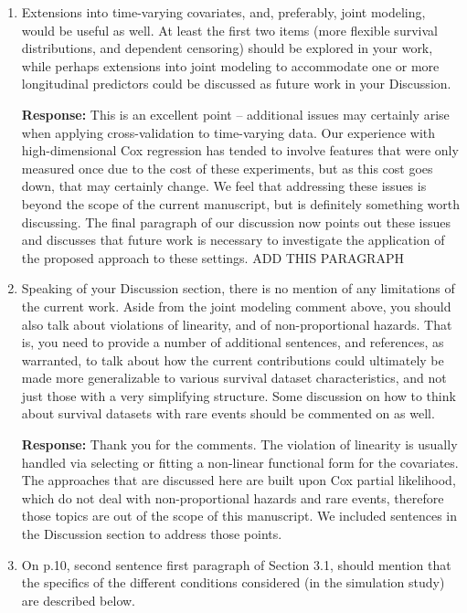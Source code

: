 \documentclass[12]{article}
\newcommand{\re}{\textbf{Response: }}
\newcommand\pb[1]{{\color{red}#1}}
\begin{document}
\begin{enumerate}[align = left]
\item Extensions into time-varying covariates, and, preferably, joint modeling, would be useful as well. At least the first two items (more flexible survival distributions, and dependent censoring) should be explored in your work, while perhaps extensions into joint modeling to accommodate one or more longitudinal predictors could be discussed as future work in your Discussion.
        
\re This is an excellent point -- additional issues may certainly arise when applying cross-validation to time-varying data. Our experience with high-dimensional Cox regression has tended to involve features that were only measured once due to the cost of these experiments, but as this cost goes down, that may certainly change. We feel that addressing these issues is beyond the scope of the current manuscript, but is definitely something worth discussing. The final paragraph of our discussion now points out these issues and discusses that future work is necessary to investigate the application of the proposed approach to these settings. \pb{ADD THIS PARAGRAPH}

\item \label{limitations} Speaking of your Discussion section, there is no mention of any limitations of the current work. Aside from the joint modeling comment above, you should also talk about violations of linearity, and of non-proportional hazards. That is, you need to provide a number of additional sentences, and references, as warranted, to talk about how the current contributions could ultimately be made more generalizable to various survival dataset characteristics, and not just those with a very simplifying structure. Some discussion on how to think about survival datasets with rare events should be commented on as well.

\re Thank you for the comments. The violation of linearity is usually handled via selecting or fitting a non-linear functional form for the covariates. The approaches that are discussed here are built upon Cox partial likelihood, which do not deal with non-proportional hazards and rare events, therefore those topics are out of the scope of this manuscript.  We included sentences in the Discussion section to address those points.

\item On p.10, second sentence first paragraph of Section 3.1, should mention that the specifics of the different conditions considered (in the simulation study) are described below.


\end{enumerate}
\end{document}
